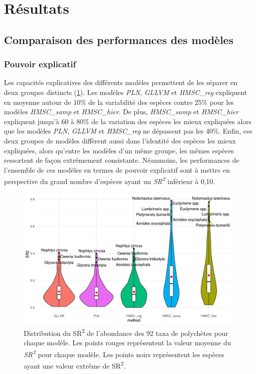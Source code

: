\documentclass[12pt,]{article}
\makeatletter
\def\maxwidth{\ifdim\Gin@nat@width>\linewidth\linewidth
\else\Gin@nat@width\fi}
\let\Oldincludegraphics\includegraphics
\renewcommand{\includegraphics}[1]{\Oldincludegraphics[width=\maxwidth]{#1}}
\makeatother
\begin{document}
\hypertarget{ruxe9sultats}{%
\section{Résultats}\label{ruxe9sultats}}

\hypertarget{comparaison-des-performances-des-moduxe8les}{%
\subsection{Comparaison des performances des
modèles}\label{comparaison-des-performances-des-moduxe8les}}

\hypertarget{pouvoir-explicatif-1}{%
\subsubsection{Pouvoir explicatif}\label{pouvoir-explicatif-1}}

Les capacités explicatives des différents modèles permettent de les
séparer en deux groupes distincts (\cref{fig:SR2}). Les modèles
\emph{PLN}, \emph{GLLVM} et \emph{HMSC\_reg} expliquent en moyenne
autour de 10\% de la variabilité des espèces contre 25\% pour les
modèles \emph{HMSC\_samp} et \emph{HMSC\_hier}. De plus,
\emph{HMSC\_samp} et \emph{HMSC\_hier} expliquent jusqu'à 60 à 80\% de
la variation des espèces les mieux expliquées alors que les modèles
\emph{PLN}, \emph{GLLVM} et \emph{HMSC\_reg} ne dépassent pas les 40\%.
Enfin, ces deux groupes de modèles diffèrent aussi dans l'identité des
espèces les mieux expliquées, alors qu'entre les modèles d'un même
groupe, les mêmes espèces ressortent de façon extrêmement consistante.
Néanmoins, les performances de l'ensemble de ces modèles en termes de
pouvoir explicatif sont à mettre en perspective du grand nombre
d'espèces ayant un \emph{SR\textsuperscript{2}} inférieur à 0,10.

\begin{figure}
\hypertarget{fig:SR2}{%
\centering
\includegraphics{figures/SR2-density-method-2.png}
\caption{Distribution du SR\textsuperscript{2} de l'abondance des 92
taxa de polychètes pour chaque modèle. Les points rouges représentent la
valeur moyenne du \emph{SR\textsuperscript{2}} pour chaque modèle. Les
points noirs représentent les espèces ayant une valeur extrême de
SR\textsuperscript{2}.}\label{fig:SR2}
}
\end{figure}
\end{document}
